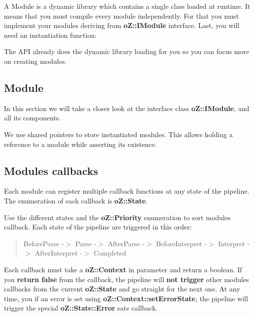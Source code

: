 A Module is a dynamic library which contains a single class loaded at runtime. It means that you must compile every module independently. For that you must implement your modules deriving from {\bfseries{o\+Z\+::\+I\+Module}} interface. Last, you will need an instantiation function\+: 
\begin{DoxyCode}{0}
\end{DoxyCode}
 The A\+PI already does the dynamic library loading for you so you can focus more on creating modules.

\subsection*{Module}

In this section we will take a closer look at the interface class {\bfseries{o\+Z\+::\+I\+Module}}, and all its components. 
\begin{DoxyCode}{0}
\end{DoxyCode}
 We use shared pointers to store instantiated modules. This allows holding a reference to a module while asserting its existence.

\subsection*{Modules callbacks}

Each module can register multiple callback functions at any state of the pipeline. The enumeration of each callback is {\bfseries{o\+Z\+::\+State}}.

Use the different states and the {\bfseries{o\+Z\+::\+Priority}} enumeration to sort modules callback. Each state of the pipeline are triggered in this order\+: \begin{quote}
Before\+Parse -\/$>$ Parse -\/$>$ After\+Parse -\/$>$ Before\+Interpret -\/$>$ Interpret -\/$>$ After\+Interpret -\/$>$ Completed \end{quote}


Each callback must take a {\bfseries{o\+Z\+::\+Context}} in parameter and return a boolean. If you {\bfseries{return false}} from the callback, the pipeline will {\bfseries{not trigger}} other modules\textquotesingle{} callbacks from the current {\bfseries{o\+Z\+::\+State}} and go straight for the next one. At any time, you if an error is set using {\bfseries{o\+Z\+::\+Context\+::set\+Error\+State}}, the pipeline will trigger the special {\bfseries{o\+Z\+::\+State\+::\+Error}} sate callback.


